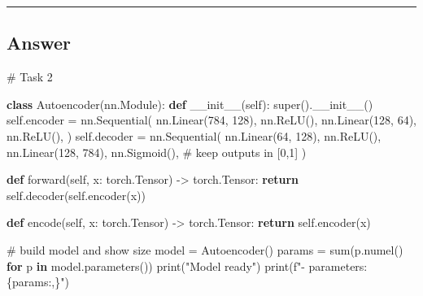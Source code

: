 \documentclass[
  letterpaper,
  DIV=11,
  numbers=noendperiod]{scrartcl}
\newenvironment{Shaded}{\begin{snugshade}}{\end{snugshade}}
\newcommand{\BuiltInTok}[1]{\textcolor[rgb]{0.00,0.23,0.31}{#1}}
\newcommand{\CommentTok}[1]{\textcolor[rgb]{0.37,0.37,0.37}{#1}}
\newcommand{\ControlFlowTok}[1]{\textcolor[rgb]{0.00,0.23,0.31}{\textbf{#1}}}
\newcommand{\DecValTok}[1]{\textcolor[rgb]{0.68,0.00,0.00}{#1}}
\newcommand{\FunctionTok}[1]{\textcolor[rgb]{0.28,0.35,0.67}{#1}}
\newcommand{\KeywordTok}[1]{\textcolor[rgb]{0.00,0.23,0.31}{\textbf{#1}}}
\newcommand{\NormalTok}[1]{\textcolor[rgb]{0.00,0.23,0.31}{#1}}
\newcommand{\OperatorTok}[1]{\textcolor[rgb]{0.37,0.37,0.37}{#1}}
\newcommand{\SpecialCharTok}[1]{\textcolor[rgb]{0.37,0.37,0.37}{#1}}
\newcommand{\SpecialStringTok}[1]{\textcolor[rgb]{0.13,0.47,0.30}{#1}}
\newcommand{\StringTok}[1]{\textcolor[rgb]{0.13,0.47,0.30}{#1}}
\newcommand{\VariableTok}[1]{\textcolor[rgb]{0.07,0.07,0.07}{#1}}
\begin{document}
\begin{center}\rule{0.5\linewidth}{0.5pt}\end{center}

\subsection{Answer}\label{answer-9}

\begin{Shaded}
\begin{Highlighting}[]
\CommentTok{\# Task 2}

\KeywordTok{class}\NormalTok{ Autoencoder(nn.Module):}
    \KeywordTok{def} \FunctionTok{\_\_init\_\_}\NormalTok{(}\VariableTok{self}\NormalTok{):}
        \BuiltInTok{super}\NormalTok{().}\FunctionTok{\_\_init\_\_}\NormalTok{()}
        \VariableTok{self}\NormalTok{.encoder }\OperatorTok{=}\NormalTok{ nn.Sequential(}
\NormalTok{            nn.Linear(}\DecValTok{784}\NormalTok{, }\DecValTok{128}\NormalTok{), nn.ReLU(),}
\NormalTok{            nn.Linear(}\DecValTok{128}\NormalTok{, }\DecValTok{64}\NormalTok{),  nn.ReLU(),}
\NormalTok{        )}
        \VariableTok{self}\NormalTok{.decoder }\OperatorTok{=}\NormalTok{ nn.Sequential(}
\NormalTok{            nn.Linear(}\DecValTok{64}\NormalTok{, }\DecValTok{128}\NormalTok{),  nn.ReLU(),}
\NormalTok{            nn.Linear(}\DecValTok{128}\NormalTok{, }\DecValTok{784}\NormalTok{), nn.Sigmoid(),  }\CommentTok{\# keep outputs in [0,1]}
\NormalTok{        )}

    \KeywordTok{def}\NormalTok{ forward(}\VariableTok{self}\NormalTok{, x: torch.Tensor) }\OperatorTok{{-}\textgreater{}}\NormalTok{ torch.Tensor:}
        \ControlFlowTok{return} \VariableTok{self}\NormalTok{.decoder(}\VariableTok{self}\NormalTok{.encoder(x))}

    \KeywordTok{def}\NormalTok{ encode(}\VariableTok{self}\NormalTok{, x: torch.Tensor) }\OperatorTok{{-}\textgreater{}}\NormalTok{ torch.Tensor:}
        \ControlFlowTok{return} \VariableTok{self}\NormalTok{.encoder(x)}

\CommentTok{\# build model and show size}
\NormalTok{model }\OperatorTok{=}\NormalTok{ Autoencoder()}
\NormalTok{params }\OperatorTok{=} \BuiltInTok{sum}\NormalTok{(p.numel() }\ControlFlowTok{for}\NormalTok{ p }\KeywordTok{in}\NormalTok{ model.parameters())}
\BuiltInTok{print}\NormalTok{(}\StringTok{"Model ready"}\NormalTok{)}
\BuiltInTok{print}\NormalTok{(}\SpecialStringTok{f"{-} parameters: }\SpecialCharTok{\{}\NormalTok{params}\SpecialCharTok{:,\}}\SpecialStringTok{"}\NormalTok{)}

\end{Highlighting}
\end{Shaded}
\end{document}
